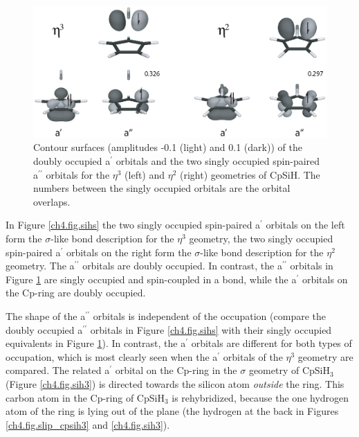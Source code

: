 \begin{figure} [htbp]
\begin{center}
\includegraphics[scale=0.67]{cyclopentadienyl/figures/sih_pi.eps}
\end{center}
\caption{Contour surfaces (amplitudes -0.1 (light) and 0.1 (dark)) of the doubly occupied a$^{\prime}$ orbitals and the two singly occupied spin-paired a$^{\prime\prime}$ orbitals for the $\eta^{3}$ (left) and $\eta^{2}$ (right) geometries of CpSiH. The numbers between the singly occupied orbitals are the orbital overlaps.}
\label{ch4.fig.sihp}
\end{figure}

In Figure \ref{ch4.fig.sihs} the two singly occupied spin-paired a$^\prime$ orbitals on the left form the $\sigma$-like bond description for the $\eta^3$ geometry, the two singly occupied spin-paired a$^\prime$ orbitals on the right form the $\sigma$-like bond description for the $\eta^2$ geometry. The a$^{\prime\prime}$ orbitals are doubly occupied. In contrast, the a$^{\prime\prime}$ orbitals in Figure \ref{ch4.fig.sihp} are singly occupied and spin-coupled in a bond, while the a$^\prime$ orbitals on the Cp-ring are doubly occupied.

The shape of the a$^{\prime\prime}$ orbitals is independent of the occupation (compare the doubly occupied a$^{\prime\prime}$ orbitals in Figure \ref{ch4.fig.sihs} with their  singly occupied equivalents in Figure \ref{ch4.fig.sihp}). In contrast, the a$^\prime$ orbitals are different for both types of occupation, which is most clearly seen when the a$^\prime$ orbitals of the $\eta^3$ geometry are compared. The related a$^\prime$ orbital on the Cp-ring in the $\sigma$ geometry of CpSiH$_3$ (Figure \ref{ch4.fig.sih3}) is directed towards the silicon atom \textit{outside} the ring. This carbon atom in the Cp-ring of CpSiH$_3$ is rehybridized, because the one hydrogen atom of the ring is lying out of the plane (the hydrogen at the back in Figures \ref{ch4.fig.slip_cpsih3} and \ref{ch4.fig.sih3}).

